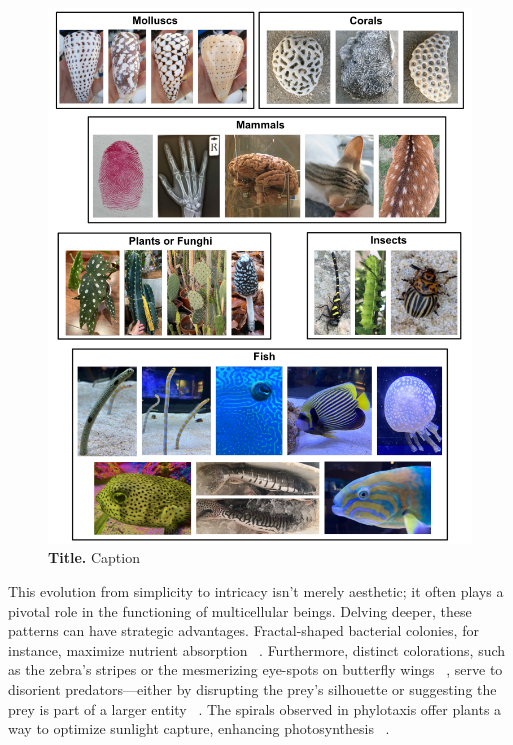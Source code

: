 \begin{figure}[h!]
    \centering
    \includegraphics[width=1\textwidth]{chapters/Introduction/pattern_examples}
    \caption{\textbf{Title.} Caption}
    \label{fig:pattern_examples}
\end{figure}
This evolution from simplicity to intricacy isn't merely aesthetic; it often plays a pivotal role in the functioning of multicellular beings.
Delving deeper, these patterns can have strategic advantages.
Fractal-shaped bacterial colonies, for instance, maximize nutrient absorption ~\parencite{Matsushita1990}.
Furthermore, distinct colorations, such as the zebra's stripes or the mesmerizing eye-spots on butterfly wings ~\parencite{Blest}, serve to disorient predators—either by disrupting the prey's silhouette or suggesting the prey is part of a larger entity ~\parencite{Stevens2006}.
The spirals observed in phylotaxis offer plants a way to optimize sunlight capture, enhancing photosynthesis ~\parencite{Strauss2020}.

